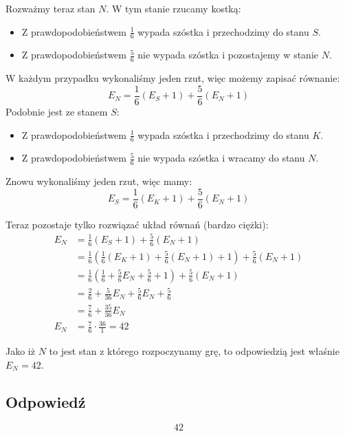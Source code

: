 Rozważmy teraz stan \(N\). W tym stanie rzucamy kostką:
\begin{itemize}
	\item Z prawdopodobieństwem \(\frac{1}{6}\) wypada szóstka i przechodzimy do stanu \(S\).
	\item Z prawdopodobieństwem \(\frac{5}{6}\) nie wypada szóstka i pozostajemy w stanie \(N\).
\end{itemize}
W każdym przypadku wykonaliśmy jeden rzut, więc możemy zapisać równanie:
\[E_N = \frac{1}{6}(E_S + 1) + \frac{5}{6}(E_N + 1)\]
Podobnie jest ze stanem \(S\):
\begin{itemize}
	\item Z prawdopodobieństwem \(\frac{1}{6}\) wypada szóstka i przechodzimy do stanu \(K\).
	\item Z prawdopodobieństwem \(\frac{5}{6}\) nie wypada szóstka i wracamy do stanu \(N\).
\end{itemize}
Znowu wykonaliśmy jeden rzut, więc mamy:
\[E_S = \frac{1}{6}(E_K + 1) + \frac{5}{6}(E_N + 1)\]

Teraz pozostaje tylko rozwiązać układ równań (bardzo ciężki):
\begin{align*}
	E_N & = \frac{1}{6}(E_S + 1) + \frac{5}{6}(E_N + 1)                                         \\
	    & = \frac{1}{6}(\frac{1}{6}(E_K + 1) + \frac{5}{6}(E_N + 1) + 1) + \frac{5}{6}(E_N + 1) \\
	    & = \frac{1}{6}(\frac{1}{6} + \frac{5}{6}E_N + \frac{5}{6} + 1) + \frac{5}{6}(E_N + 1)  \\
	    & = \frac{2}{6} + \frac{5}{36}E_N + \frac{5}{6}E_N + \frac{5}{6}                        \\
	    & = \frac{7}{6} + \frac{35}{36}E_N                                                      \\
	E_N & = \frac{7}{6} \cdot \frac{36}{1} = 42
\end{align*}

Jako iż \(N\) to jest stan z którego rozpoczynamy grę, to odpowiedzią jest właśnie \(E_N = 42\).

\subsection*{Odpowiedź}
\[
	\boxed{\text{42}}
\]
